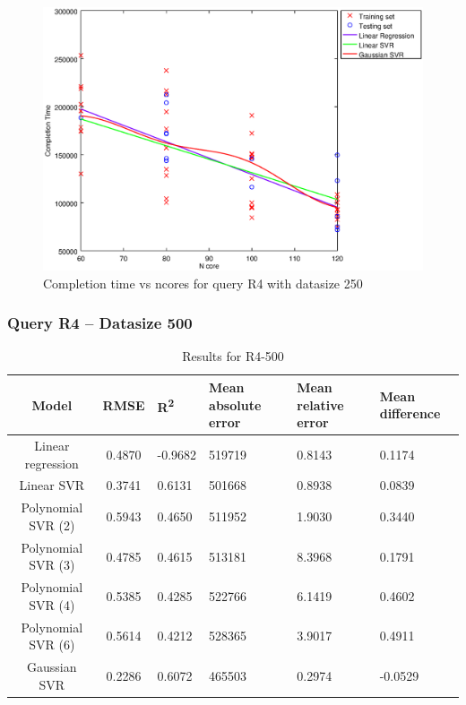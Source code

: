 \documentclass[a4paper,11pt]{article}
\begin{document}
\begin {figure}[hbtp]
\centering
\includegraphics[width=\textwidth]{output/R4_250_ONLY_1_LINEAR_NCORE/plot_R4_250_bestmodels.eps}
\caption{Completion time vs ncores for query R4 with datasize 250}
\label{fig:coreonly_linear_R4_250}
\end {figure}

\newpage
\subsubsection{Query R4 -- Datasize 500}
\begin{table}[H]
	\centering
	\begin{adjustbox}{center}
		\begin{tabular}{c | c M{1.2cm} M{2.5cm} M{2.5cm} M{1.8cm}}
			Model & RMSE & R\textsuperscript{2} & Mean absolute error & Mean relative error & Mean difference \tabularnewline
			\hline
			Linear regression & 0.4870 & -0.9682 & 519719 & 0.8143 & 0.1174 \\
			Linear SVR & 0.3741 & 0.6131 & 501668 & 0.8938 & 0.0839 \\
			Polynomial SVR (2) & 0.5943 & 0.4650 & 511952 & 1.9030 & 0.3440 \\
			Polynomial SVR (3) & 0.4785 & 0.4615 & 513181 & 8.3968 & 0.1791 \\
			Polynomial SVR (4) & 0.5385 & 0.4285 & 522766 & 6.1419 & 0.4602 \\
			Polynomial SVR (6) & 0.5614 & 0.4212 & 528365 & 3.9017 & 0.4911 \\
			Gaussian SVR & 0.2286 & 0.6072 & 465503 & 0.2974 & -0.0529 \\
		\end{tabular}
	\end{adjustbox}
	\\
	\caption{Results for R4-500}
	\label{fig:coreonly_linear_R4_500}
\end{table}
\end{document}
